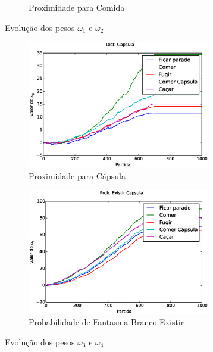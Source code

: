 \begin{figure}[H]
\begin{subfigure}[t]{.5\textwidth}
		\caption{Proximidade para Comida}
		\label{img:5ComportamentosMapaOriginal:PesoDistComida}
	\end{subfigure}
	\caption{Evolução dos pesos $ \omega_1 $ e $ \omega_2 $}
	\label{img:5ComportamentosMapaOriginal:PesoBiasAndDistComida}
\end{figure}

\begin{figure}[H]
	\centering
	\begin{subfigure}[t]{.5\textwidth}
		\centering
		\includegraphics[width=80mm]{images/5_behaviors_original_map/weights____pol__DistCapsula}
		\caption{Proximidade para Cápsula}
		\label{img:5ComportamentosMapaOriginal:PesoDistCapsula}
	\end{subfigure}%
	\begin{subfigure}[t]{.5\textwidth}
		\centering
		\includegraphics[width=80mm]{images/5_behaviors_original_map/weights____pol__ProbExistirCapsula}
		\caption{Probabilidade de Fantasma Branco Existir}
		\label{img:5ComportamentosMapaOriginal:PesoProbFantasmaBrancoExistir}
	\end{subfigure}
	\caption{Evolução dos pesos $ \omega_3 $ e $ \omega_4 $}
	\label{img:5ComportamentosMapaOriginal:PesoDistCapsulaOuProbCapsulaExistir}
\end{figure}

